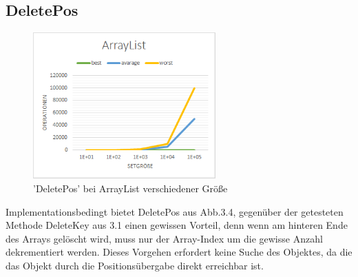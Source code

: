\documentclass[paper=a4, fontsize=11pt]{scrartcl} %
\numberwithin{equation}{section} %
\numberwithin{figure}{section} %
\numberwithin{table}{section} %
\begin{document}
\subsection{DeletePos}
\begin{figure}[h]
	\begin{center}
		\includegraphics[width=7cm]{grafiken/DeletePos-ArrayList.png}
		\caption{'DeletePos' bei ArrayList verschiedener Größe}
	\end{center}
\end{figure}
\newpage
Implementationsbedingt bietet DeletePos aus Abb.3.4, gegenüber der getesteten Methode DeleteKey aus 3.1 einen gewissen Vorteil, denn wenn am hinteren Ende des Arrays gelöscht wird, muss nur der Array-Index um die gewisse Anzahl dekrementiert werden. Dieses Vorgehen erfordert keine Suche des Objektes, da die das Objekt durch die Positionsübergabe direkt erreichbar ist.
\end{document}
